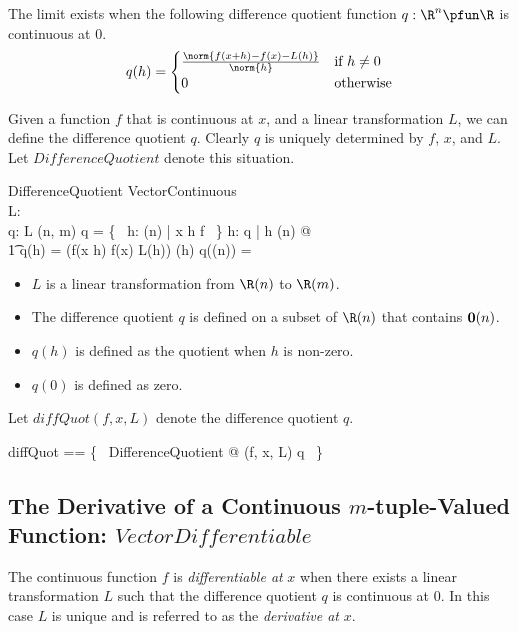 \documentclass{amsart}
\begin{document}
The limit exists when the following difference quotient function $q: \R^n \pfun \R$ is continuous at $0$.
$$
q(h) = 
\begin{cases}
	\frac{\norm{f(x+h) - f(x) - L(h)}}{\norm{h}}	&	\text{if } h \neq 0\\
	0								&	\text{otherwise}
\end{cases}
$$

Given a function $f$ that is continuous at $x$, and a linear transformation $L$,
we can define the difference quotient $q$.
Clearly $q$ is uniquely determined by $f$, $x$, and $L$.
Let $DifferenceQuotient$ denote this situation.

\begin{schema}{DifferenceQuotient}
	VectorContinuous \\
	L: \Rinf \pfun \Rinf \\
	q: \Rinf \pfun \R
\where
	L \in \linRtup(n, m)
\also
	\dom q = \{~ h: \Rtup(n) | x \addRinf h \in \dom f ~\}
\also
	\forall h: \dom q | h \neq \zeroRtup(n) @ \\
	\t1	q(h) = \normRinf(f(x \addRinf h) \subRinf f(x) \subRinf L(h)) \divR \normRinf(h)
\also
	q(\zeroRtup(n)) = \zeroR
\end{schema}

\begin{itemize}
\item $L$ is a linear transformation from $\Rtup(n)$ to $\Rtup(m)$.
\item The difference quotient $q$ is defined on a subset of $\Rtup(n)$ that contains $\operatorname{\mathbf{0}}(n)$.
\item $q(h)$ is defined as the quotient when $h$ is non-zero.
\item $q(0)$ is defined as zero.
\end{itemize}

Let $diffQuot(f,x,L)$ denote the difference quotient $q$.

\begin{zed}
diffQuot == \{~ DifferenceQuotient @ (f, x, L) \mapsto q ~\}
\end{zed}

\subsection{The Derivative of a Continuous $m$-tuple-Valued Function: $VectorDifferentiable$}

The continuous function $f$ is \textit{differentiable at} $x$ when there exists a linear transformation $L$ 
such that the difference quotient $q$ is continuous at $0$.
In this case $L$ is unique and is referred to as the \textit{derivative at} $x$.
\end{document}
